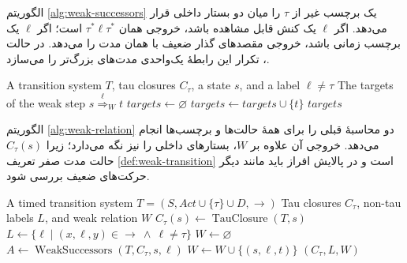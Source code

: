 الگوریتم \ref{alg:weak-successors} یک برچسب غیر از $\tau$ را میان دو بستار داخلی قرار می‌دهد. اگر $\ell$ یک کنش قابل مشاهده باشد، خروجی همان $\tau^*\ell\tau^*$ است؛ اگر $\ell$ یک برچسب زمانی باشد، خروجی مقصدهای گذار ضعیف با همان مدت را می‌دهد. در حالت ، تکرار این رابطهٔ یک‌واحدی مدت‌های بزرگ‌تر را می‌سازد.

\begin{algorithm}[htbp]
\onehalfspacing
\caption{}
\label{alg:weak-successors}
\begin{latin}
\begin{algorithmic}[1]
\REQUIRE A transition system $T$, tau closures $C_\tau$, a state $s$, and a label $\ell\neq\tau$
\ENSURE The targets of the weak step $s\overset{\ell}{\Rightarrow}_W t$
\STATE $\mathit{targets}\gets\varnothing$
            \STATE $\mathit{targets}\gets\mathit{targets}\cup\{t\}$
        \ENDFOR
    \ENDFOR
\ENDFOR
\RETURN $\mathit{targets}$
\end{algorithmic}
\end{latin}
\end{algorithm}

الگوریتم \ref{alg:weak-relation} دو محاسبهٔ قبلی را برای همهٔ حالت‌ها و برچسب‌ها انجام می‌دهد. خروجی آن علاوه بر $W$، بستارهای داخلی را نیز نگه می‌دارد؛ زیرا $C_\tau(s)$ حالت مدت صفر تعریف \ref{def:weak-transition} است و در پالایش افراز باید مانند دیگر حرکت‌های ضعیف بررسی شود.

\begin{algorithm}[htbp]
\onehalfspacing
\caption{}
\label{alg:weak-relation}
\begin{latin}
\begin{algorithmic}[1]
\REQUIRE A timed transition system $T=(S,\mathit{Act}\cup\{\tau\}\cup D,\rightarrow)$
\ENSURE Tau closures $C_\tau$, non-tau labels $L$, and weak relation $W$
    \STATE $C_\tau(s)\gets\operatorname{TauClosure}(T,s)$
\ENDFOR
\STATE $L\gets\{\ell\mid (x,\ell,y)\in\rightarrow\ \land\ \ell\neq\tau\}$
\STATE $W\gets\varnothing$
        \STATE $A\gets\operatorname{WeakSuccessors}(T,C_\tau,s,\ell)$
            \STATE $W\gets W\cup\{(s,\ell,t)\}$
        \ENDFOR
    \ENDFOR
\ENDFOR
\RETURN $(C_\tau,L,W)$
\end{algorithmic}
\end{latin}
\end{algorithm}

